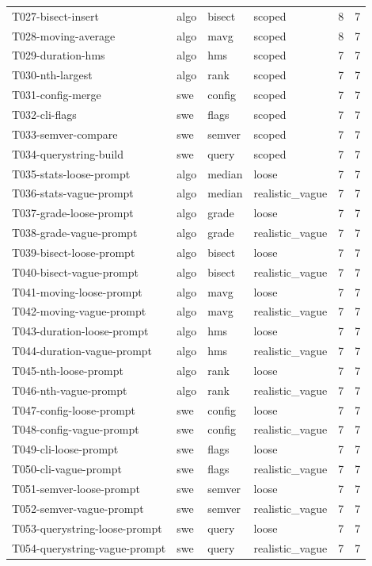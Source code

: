 \begin{tabular}{llllll}
T027-bisect-insert & algo & bisect & scoped & 8 & 7 \\
T028-moving-average & algo & mavg & scoped & 8 & 7 \\
T029-duration-hms & algo & hms & scoped & 7 & 7 \\
T030-nth-largest & algo & rank & scoped & 7 & 7 \\
T031-config-merge & swe & config & scoped & 7 & 7 \\
T032-cli-flags & swe & flags & scoped & 7 & 7 \\
T033-semver-compare & swe & semver & scoped & 7 & 7 \\
T034-querystring-build & swe & query & scoped & 7 & 7 \\
T035-stats-loose-prompt & algo & median & loose & 7 & 7 \\
T036-stats-vague-prompt & algo & median & realistic\_vague & 7 & 7 \\
T037-grade-loose-prompt & algo & grade & loose & 7 & 7 \\
T038-grade-vague-prompt & algo & grade & realistic\_vague & 7 & 7 \\
T039-bisect-loose-prompt & algo & bisect & loose & 7 & 7 \\
T040-bisect-vague-prompt & algo & bisect & realistic\_vague & 7 & 7 \\
T041-moving-loose-prompt & algo & mavg & loose & 7 & 7 \\
T042-moving-vague-prompt & algo & mavg & realistic\_vague & 7 & 7 \\
T043-duration-loose-prompt & algo & hms & loose & 7 & 7 \\
T044-duration-vague-prompt & algo & hms & realistic\_vague & 7 & 7 \\
T045-nth-loose-prompt & algo & rank & loose & 7 & 7 \\
T046-nth-vague-prompt & algo & rank & realistic\_vague & 7 & 7 \\
T047-config-loose-prompt & swe & config & loose & 7 & 7 \\
T048-config-vague-prompt & swe & config & realistic\_vague & 7 & 7 \\
T049-cli-loose-prompt & swe & flags & loose & 7 & 7 \\
T050-cli-vague-prompt & swe & flags & realistic\_vague & 7 & 7 \\
T051-semver-loose-prompt & swe & semver & loose & 7 & 7 \\
T052-semver-vague-prompt & swe & semver & realistic\_vague & 7 & 7 \\
T053-querystring-loose-prompt & swe & query & loose & 7 & 7 \\
T054-querystring-vague-prompt & swe & query & realistic\_vague & 7 & 7 \\
\bottomrule
\end{tabular}
